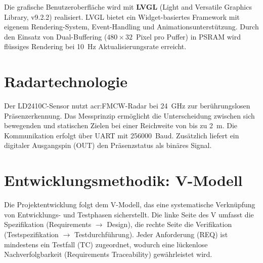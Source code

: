 Die grafische Benutzeroberfläche wird mit \textbf{LVGL} (Light and Versatile Graphics Library, v9.2.2) realisiert. LVGL bietet ein Widget-basiertes Framework mit eigenem Rendering-System, Event-Handling und Animationsunterstützung. Durch den Einsatz von Dual-Buffering ($480 \times 32$~Pixel pro Puffer) in PSRAM wird flüssiges Rendering bei \SI{10}{Hz} Aktualisierungsrate erreicht.

\section{Radartechnologie}
\label{sec:radar}

Der LD2410C-Sensor nutzt \acrshort{acr:FMCW}-Radar bei \SI{24}{GHz} zur berührungslosen Präsenzerkennung. Das Messprinzip ermöglicht die Unterscheidung zwischen sich bewegenden und statischen Zielen bei einer Reichweite von bis zu \SI{2}{\metre}. Die Kommunikation erfolgt über UART mit \SI{256000}{Baud}. Zusätzlich liefert ein digitaler Ausgangspin (OUT) den Präsenzstatus als binäres Signal.

\section{Entwicklungsmethodik: V-Modell}
\label{sec:vmodell}

Die Projektentwicklung folgt dem V-Modell, das eine systematische Verknüpfung von Entwicklungs- und Testphasen sicherstellt. Die linke Seite des V umfasst die Spezifikation (Requirements $\rightarrow$ Design), die rechte Seite die Verifikation (Testspezifikation $\rightarrow$ Testdurchführung). Jeder Anforderung (REQ) ist mindestens ein Testfall (TC) zugeordnet, wodurch eine lückenlose Nachverfolgbarkeit (Requirements Traceability) gewährleistet wird.
